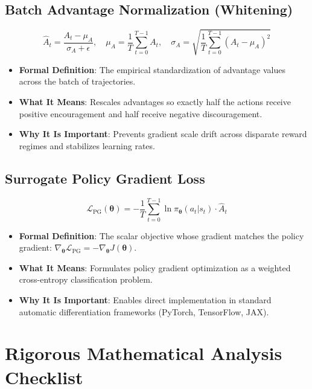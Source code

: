 \documentclass[11pt,a4paper]{article}
\theoremstyle{definition}
\begin{document}
\subsection{Batch Advantage Normalization (Whitening)}
{\boldmath
\begin{equation}
\widehat{A}_t = \frac{A_t - \mu_A}{\sigma_A + \epsilon}, \quad \mu_A = \frac{1}{T}\sum_{t=0}^{T-1} A_t, \quad \sigma_A = \sqrt{\frac{1}{T}\sum_{t=0}^{T-1} (A_t - \mu_A)^2}
\end{equation}
}
\begin{itemize}
    \item \textbf{Formal Definition}: The empirical standardization of advantage values across the batch of trajectories.
    \item \textbf{What It Means}: Rescales advantages so exactly half the actions receive positive encouragement and half receive negative discouragement.
    \item \textbf{Why It Is Important}: Prevents gradient scale drift across disparate reward regimes and stabilizes learning rates.
\end{itemize}

\subsection{Surrogate Policy Gradient Loss}
{\boldmath
\begin{equation}
\mathcal{L}_{\text{PG}}(\boldsymbol{\theta}) = - \frac{1}{T} \sum_{t=0}^{T-1} \ln \pi_{\boldsymbol{\theta}}(a_t | s_t) \cdot \widehat{A}_t
\end{equation}
}
\begin{itemize}
    \item \textbf{Formal Definition}: The scalar objective whose gradient matches the policy gradient: $\nabla_{\boldsymbol{\theta}} \mathcal{L}_{\text{PG}} = - \nabla_{\boldsymbol{\theta}} J(\boldsymbol{\theta})$.
    \item \textbf{What It Means}: Formulates policy gradient optimization as a weighted cross-entropy classification problem.
    \item \textbf{Why It Is Important}: Enables direct implementation in standard automatic differentiation frameworks (PyTorch, TensorFlow, JAX).
\end{itemize}

\section{Rigorous Mathematical Analysis Checklist}
\end{document}
